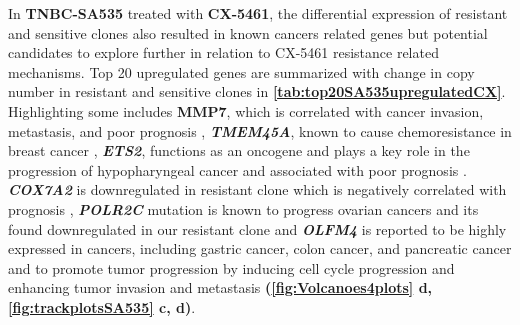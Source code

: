 In \textbf{TNBC-SA535} treated with \textbf{CX-5461}, the differential expression of resistant and sensitive clones also resulted in known cancers related genes but potential candidates to explore further in relation to CX-5461 resistance related mechanisms. Top 20 upregulated genes are summarized with change in copy number in resistant and sensitive clones in \textbf{\autoref{tab:top20SA535upregulatedCX}}.
Highlighting some  includes \textbf{MMP7}, which is correlated with cancer invasion, metastasis, and poor prognosis \cite{mcgowan2008matrix} ,
\textit{\textbf{TMEM45A}}, known to cause chemoresistance in breast cancer \cite{schmit2019characterization},
\textit{\textbf{ETS2}}, functions as an oncogene and plays a key role in the progression of hypopharyngeal cancer and associated with poor prognosis \cite{fu2017high, ge2008role}.
\textit{\textbf{COX7A2}} is downregulated in resistant clone which is negatively correlated with prognosis \cite{deng2018overexpression},
\textit{\textbf{POLR2C}} mutation is known to progress ovarian cancers and its found downregulated in our resistant clone \cite {moriwaki2017polr2c} and
\textit{\textbf{OLFM4}} is reported to be highly expressed in cancers, including gastric cancer, colon cancer, and pancreatic cancer and to promote tumor progression by inducing cell cycle progression and enhancing tumor invasion and metastasis \cite{ashizawa2019olfm4} \textbf{(\autoref{fig:Volcanoes4plots} d, \autoref{fig:trackplotsSA535} c, d)}.


